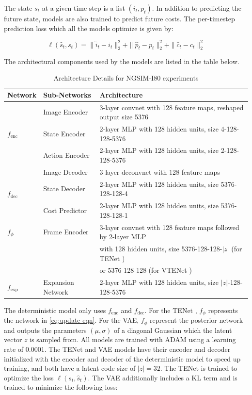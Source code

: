 \documentclass{article}
\newcommand{\modelname}{TENet }
\begin{document}
\begin{appendices}
  The state $s_t$ at a given time step is a list $(i_t, p_t)$.
  In addition to predicting the future state, models are also trained to predict future costs.
  The per-timestep prediction loss which all the models optimize is given by:

  \begin{equation}
    \ell(\hat{s}_t, s_t) = \|\hat{i}_t - i_t \|_2^2 + \| \hat{p}_t - p_t \|_2^2 + \| \hat{c}_t - c_t \|_2^2
  \end{equation}

  The architectural components used by the models are listed in the table below.

  \begin{table}[h]
    \caption{Architecture Details for NGSIM-I80 experiments}
    \label{sample-table}
    \centering
    \begin{tabular}{lll}
      \toprule
      Network & Sub-Networks     & Architecture    \\
      \midrule
      \multirow{3}{*}{$f_\text{enc}$} & Image Encoder & 3-layer convnet with 128 feature maps, reshaped output size 5376 \\
      & State Encoder & 2-layer MLP with 128 hidden units, size 4-128-128-5376 \\
      & Action Encoder & 2-layer MLP with 128 hidden units, size 2-128-128-5376  \\
      \hline
      \multirow{3}{*}{$f_\text{dec}$} & Image Decoder & 3-layer deconvnet with 128 feature maps \\
      & State Decoder & 2-layer MLP with 128 hidden units, size 5376-128-128-4 \\
      & Cost Predictor & 2-layer MLP with 128 hidden units, size 5376-128-128-1 \\
      \hline
      $f_\phi$ & Frame Encoder & 3-layer convnet with 128 feature maps followed by 2-layer MLP \\ & & with 128 hidden units, size 5376-128-128-$|z|$ (for \modelname) \\
      &               & or 5376-128-128 (for V\modelname) \\
      \hline
      $f_\text{exp}$ & Expansion Network & 2-layer MLP with 128 hidden units, size $|z|$-128-128-5376\\
      \hline
      \bottomrule
    \end{tabular}
  \end{table}

  The deterministic model only uses $f_\text{enc}$ and $f_\text{dec}$.
  For the \modelname, $f_\phi$ represents the network in \cref{eq:update-eqn}.
  For the VAE, $f_\phi$ represent the posterior network and outputs the parameters $(\mu, \sigma)$ of a diagonal Gaussian which the latent vector $z$ is sampled from.
  All models are trained with ADAM \citep{ADAM} using a learning rate of 0.0001.
  The \modelname and VAE models have their encoder and decoder initialized with the encoder and decoder of the deterministic model to speed up training, and both have a latent code size of $|z|=32$.
  The \modelname is trained to optimize the loss $\ell(s_t, \hat{s}_t)$.
  The VAE additionally includes a KL term and is trained to minimize the following loss:


\end{appendices}
\end{document}
